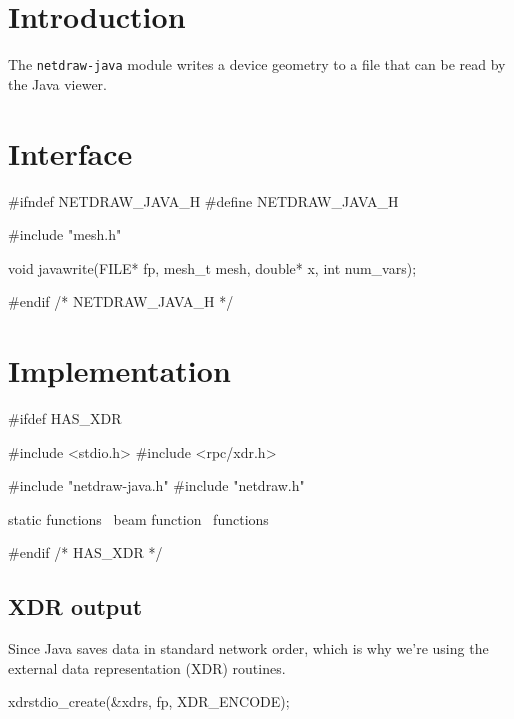 \section{Introduction}

The {\tt{}netdraw-java} module writes a device geometry to a file
that can be read by the Java viewer.


\section{Interface}

\endmoddef
#ifndef NETDRAW_JAVA_H
#define NETDRAW_JAVA_H

#include "mesh.h"

void javawrite(FILE* fp, mesh_t mesh, double* x, int num_vars);

#endif /* NETDRAW_JAVA_H */
\nwendcode{}\nwdocspar


\section{Implementation}

\nwenddocs{}\endmoddef
#ifdef HAS_XDR

#include <stdio.h>
#include <rpc/xdr.h>

#include "netdraw-java.h"
#include "netdraw.h"

\LA{}static functions~{\nwtagstyle{}}\RA{}
\LA{}beam function~{\nwtagstyle{}}\RA{}
\LA{}functions~{\nwtagstyle{}}\RA{}

#endif /* HAS_XDR */
\nwendcode{}\nwdocspar

\subsection{XDR output}

Since Java saves data in standard network order, which is why we're
using the external data representation (XDR) routines.

\nwenddocs{}\endmoddef
xdrstdio_create(&xdrs, fp, XDR_ENCODE);
\nwendcode{}\nwdocspar

